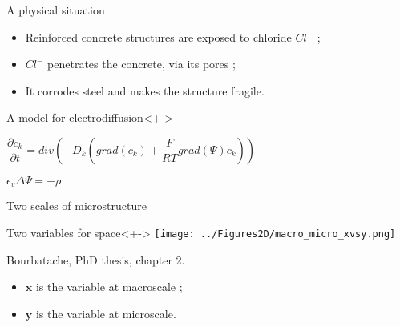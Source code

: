 
\begin{frame}
%
\begin{block}{A physical situation}
\begin{itemize}%
\item<+-> Reinforced concrete structures are exposed to chloride $Cl^-$ ;
\item<+-> $Cl^-$ penetrates the concrete, via its pores ;
\item<+-> It corrodes steel and makes the structure fragile.
\end{itemize}
\end{block}
%
\begin{block}{A model for electrodiffusion}<+->
\begin{description}
\item<+-> [The Nernst-Planck equation] $\dfrac{\partial{c_k}}{\partial{t}}=div\left(-D_k\left(grad(c_k)+\dfrac{F}{RT}grad(\Psi)c_k\right)\right)$
\item<+-> [Poisson equation] $\epsilon_v \Delta \Psi=-\rho$
\end{description}
\end{block}
%
\end{frame}

\begin{frame}{Two scales of microstructure}
%
\begin{block}{Two variables for space}<+->
%
\texttt{[image: ../Figures2D/macro\_micro\_xvsy.png]}

\par
Bourbatache, PhD thesis, chapter 2.
%
\begin{itemize}
\item<+-> $\mathbf{x}$ is the variable at macroscale ;
\item<+-> $\mathbf{y}$ is the variable at microscale.
\end{itemize}
%
\end{block}
%
\end{frame}

